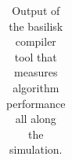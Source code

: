 \begin{table}
\begin{tabular}{c|c|c|c|l}
\end{tabular}
\caption{Output of the basilisk compiler tool that measures algorithm performance all along the simulation.}
\end{table}



